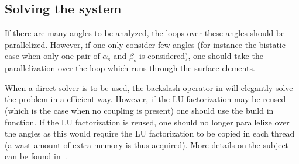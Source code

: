 \subsection{Solving the system}
If there are many angles to be analyzed, the loops over these angles should be parallelized. However, if one only consider few angles (for instance the bistatic case when only one pair of $\alpha_{\mathrm{s}}$ and $\beta_{\mathrm{s}}$ is considered), one should take the parallelization over the loop which runs through the surface elements.

When a direct solver is to be used, the backslash operator in \MATLAB will elegantly solve the problem in a efficient way. However, if the LU factorization may be reused (which is the case when no coupling is present) one should use the build in  function. If the LU factorization is reused, one should no longer parallelize over the angles as this would require the LU factorization to be copied in each thread (a wast amount of extra memory is thus acquired). More details on the subject can be found in~\cite{Davis2013anf}.

